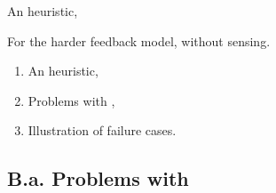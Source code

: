 \documentclass[12pt,english,ignorenonframetext,]{beamer}
\providecommand{\tightlist}{%
  \setlength{\itemsep}{0pt}\setlength{\parskip}{0pt}}
\begin{document}
\begin{frame}{An heuristic, \Selfish}

For the harder feedback model, without sensing.

\begin{enumerate}
\def\labelenumi{\arabic{enumi}.}
\tightlist
\item
  An heuristic,\vspace*{15pt}
\item
  Problems with \Selfish,\vspace*{15pt}
\item
  Illustration of failure cases.
\end{enumerate}

\end{frame}



\subsection{\hfill{}B.a. Problems with \Selfish\hfill{}}
\end{document}
